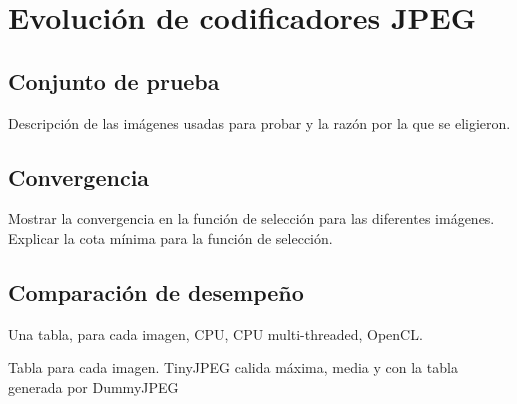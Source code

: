 
\chapter{Evolución de codificadores JPEG}\label{ch:resultados_evolucion}

\section{Conjunto de prueba} \label{sec:testset}

Descripción de las imágenes usadas para probar y la razón por la que se eligieron.

\section{Convergencia}

Mostrar la convergencia en la función de selección para las diferentes imágenes.
Explicar la cota mínima para la función de selección.

\section{Comparación de desempeño}

Una tabla, para cada imagen, CPU, CPU multi-threaded, OpenCL.

Tabla para cada imagen. TinyJPEG calida máxima, media y con la tabla generada por DummyJPEG

